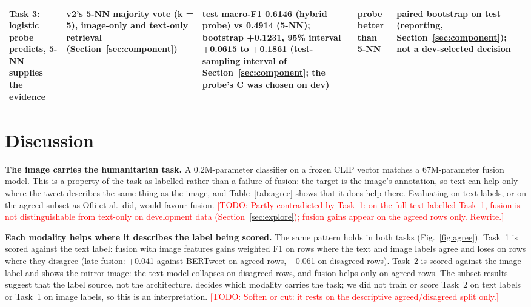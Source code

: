 \documentclass[conference]{IEEEtran}
\newcommand{\todo}[1]{\textcolor{red}{[TODO: #1]}}
\begin{document}
\begin{table}[t]
\begin{tabular}{p{2.2cm}p{3.1cm}p{5.6cm}p{3.2cm}p{2.6cm}}
\midrule
Task 3: logistic probe predicts, 5-NN supplies the evidence & v2's 5-NN majority vote (k = 5), image-only and text-only retrieval (Section~\ref{sec:component}) & test macro-F1 0.6146 (hybrid probe) vs 0.4914 (5-NN); bootstrap +0.1231, 95\% interval +0.0615 to +0.1861 (test-sampling interval of Section~\ref{sec:component}; the probe's C was chosen on dev) & probe better than 5-NN & paired bootstrap on test (reporting, Section~\ref{sec:component}); not a dev-selected decision \\

\bottomrule
\end{tabular}
\end{table}

\section{Discussion}

\textbf{The image carries the humanitarian task.} A 0.2M-parameter classifier on a frozen CLIP vector matches a 67M-parameter fusion model. This is a property of the task as labelled rather than a failure of fusion: the target is the image's annotation, so text can help only where the tweet describes the same thing as the image, and Table~\ref{tab:agree} shows that it does help there. Evaluating on text labels, or on the agreed subset as Ofli et al.\ did, would favour fusion. \todo{Partly contradicted by Task~1: on the full text-labelled Task~1, fusion is not distinguishable from text-only on development data (Section~\ref{sec:explore}); fusion gains appear on the agreed rows only. Rewrite.}

\textbf{Each modality helps where it describes the label being scored.}\label{sec:discussion_modality} The same pattern holds in both tasks (Fig.~\ref{fig:agree}). Task~1 is scored against the text label: fusion with image features gains weighted F1 on rows where the text and image labels agree and loses on rows where they disagree (late fusion: +0.041 against BERTweet on agreed rows, $-$0.061 on disagreed rows). Task~2 is scored against the image label and shows the mirror image: the text model collapses on disagreed rows, and fusion helps only on agreed rows. The subset results suggest that the label source, not the architecture, decides which modality carries the task; we did not train or score Task~2 on text labels or Task~1 on image labels, so this is an interpretation. \todo{Soften or cut: it rests on the descriptive agreed/disagreed split only.}
\end{document}
